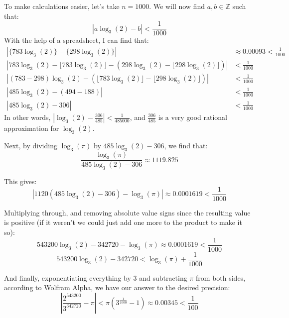 \documentclass{article}
\begin{document}
To make calculations easier, let's take $n = 1000$. We will now find $a,b \in \mathbb{Z}$ such that:
\[ \left| a\log_3(2) - b \right| < \frac{1}{1000} \]
With the help of a spreadsheet, I can find that:
\begin{align*}
	\left| \{783\log_3(2)\} - \{298\log_3(2)\}\right| &\approx 0.00093 < \frac{1}{1000} \\
	\left| 783\log_3(2) - \lfloor 783\log_3(2) \rfloor - (298\log_3(2) - \lfloor 298 \log_3(2) \rfloor) \right| &< \frac{1}{1000} \\
	\left| (783 - 298)\log_3(2) - (\lfloor 783\log_3(2) \rfloor - \lfloor 298 \log_3(2) \rfloor) \right| &< \frac{1}{1000} \\
	\left| 485\log_3(2) - (494 - 188) \right| &< \frac{1}{1000} \\
	\left| 485\log_3(2) - 306 \right| &< \frac{1}{1000} 
\end{align*}
In other words, $\left| \log_3(2) - \frac{306}{485} \right| < \frac{1}{485000}$, and $\frac{306}{485}$ is a very good rational
approximation for $\log_3(2)$.

Next, by dividing $\log_3(\pi)$ by $485\log_3(2) - 306$, we find that:
\[ \frac{\log_3(\pi)}{485\log_3(2) - 306} \approx 1119.825 \]

This gives:
\[ \left| 1120(485\log_3(2) - 306) - \log_3(\pi) \right| \approx 0.0001619 < \frac{1}{1000} \]

Multiplying through, and removing absolute value signs since the resulting value is positive
(if it weren't we could just add one more to the product to make it so):
\[ 543200\log_3(2) - 342720 - \log_3(\pi) \approx 0.0001619 < \frac{1}{1000} \]
\[ 543200\log_3(2) - 342720 < \log_3(\pi) + \frac{1}{1000} \]

And finally, exponentiating everything by 3 and subtracting $\pi$ from both sides, according to Wolfram Alpha,
we have our answer to the desired precision:
\[ \left| \frac{2^{543200}}{3^{342720}} - \pi \right| < \pi(3^{\frac{1}{1000}} - 1) \approx 0.00345 < \frac{1}{100} \]
\end{document}
